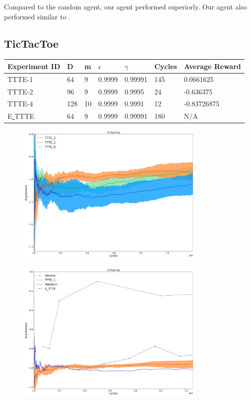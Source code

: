 \documentclass{article}
\theoremstyle{definition}
\newtheorem{primary statistics}[definition]{Primary Statistics}
\newtheorem{auxiliary statistics}[definition]{Auxiliary Statistics}
\begin{document}
Compared to the random agent, our agent performed superiorly. Our agent also performed similar to \cite{veness2011monte}.

\subsection{TicTacToe}
\begin{tabular}{|l|l|l|l|l|l|l|}
 \hline \centering
 Experiment ID& D & m & $\epsilon$ & $\gamma$ & Cycles & Average Reward \\ \hline
TTTE-1   & 64        & 9           & 0.9999      & 0.99991           & 145    & 0.0661625         \\ \hline
TTTE-2   & 96        & 9           & 0.9999      & 0.9995            & 24     & -0.636375         \\ \hline
TTTE-4   & 128       & 10          & 0.9999      & 0.9991            & 12     & -0.83726875  \\  \hline  
E\underline{ }TTTE  & 64       & 9          & 0.9999      & 0.99991            & 180     & N/A  \\  \hline    
\end{tabular} 

 \begin{figure}[h]
 \centering
    \includegraphics[width=9.1cm]{4_TicTacToe}
\end{figure}

 \begin{figure}[h]
 \centering
    \includegraphics[width=9.1cm]{TicTacToe}
\end{figure}
\end{document}
